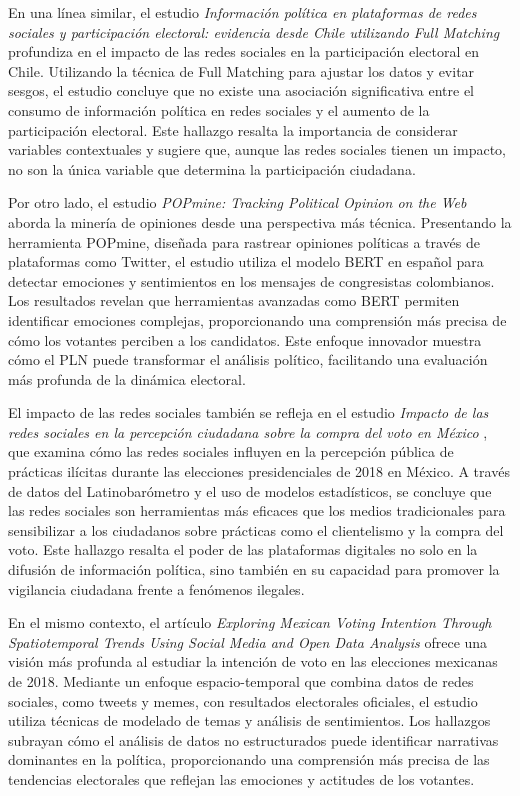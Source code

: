 \documentclass[10pt, a4paper]{article}
\begin{document}
	En una línea similar, el estudio \textit{Información política en plataformas de redes sociales y participación electoral: evidencia desde Chile utilizando Full Matching} \parencite{Fernandez2020} profundiza en el impacto de las redes sociales en la participación electoral en Chile. Utilizando la técnica de Full Matching para ajustar los datos y evitar sesgos, el estudio concluye que no existe una asociación significativa entre el consumo de información política en redes sociales y el aumento de la participación electoral. Este hallazgo resalta la importancia de considerar variables contextuales y sugiere que, aunque las redes sociales tienen un impacto, no son la única variable que determina la participación ciudadana.
	
	Por otro lado, el estudio \textit{POPmine: Tracking Political Opinion on the Web} \parencite{Perez2020} aborda la minería de opiniones desde una perspectiva más técnica. Presentando la herramienta POPmine, diseñada para rastrear opiniones políticas a través de plataformas como Twitter, el estudio utiliza el modelo BERT en español para detectar emociones y sentimientos en los mensajes de congresistas colombianos. Los resultados revelan que herramientas avanzadas como BERT permiten identificar emociones complejas, proporcionando una comprensión más precisa de cómo los votantes perciben a los candidatos. Este enfoque innovador muestra cómo el PLN puede transformar el análisis político, facilitando una evaluación más profunda de la dinámica electoral.
	
	El impacto de las redes sociales también se refleja en el estudio \textit{Impacto de las redes sociales en la percepción ciudadana sobre la compra del voto en México} \parencite{Hernandez2019}, que examina cómo las redes sociales influyen en la percepción pública de prácticas ilícitas durante las elecciones presidenciales de 2018 en México. A través de datos del Latinobarómetro y el uso de modelos estadísticos, se concluye que las redes sociales son herramientas más eficaces que los medios tradicionales para sensibilizar a los ciudadanos sobre prácticas como el clientelismo y la compra del voto. Este hallazgo resalta el poder de las plataformas digitales no solo en la difusión de información política, sino también en su capacidad para promover la vigilancia ciudadana frente a fenómenos ilegales.
	
	En el mismo contexto, el artículo \textit{Exploring Mexican Voting Intention Through Spatiotemporal Trends Using Social Media and Open Data Analysis} \parencite{Zagal2020} ofrece una visión más profunda al estudiar la intención de voto en las elecciones mexicanas de 2018. Mediante un enfoque espacio-temporal que combina datos de redes sociales, como tweets y memes, con resultados electorales oficiales, el estudio utiliza técnicas de modelado de temas y análisis de sentimientos. Los hallazgos subrayan cómo el análisis de datos no estructurados puede identificar narrativas dominantes en la política, proporcionando una comprensión más precisa de las tendencias electorales que reflejan las emociones y actitudes de los votantes.
	
\end{document}
